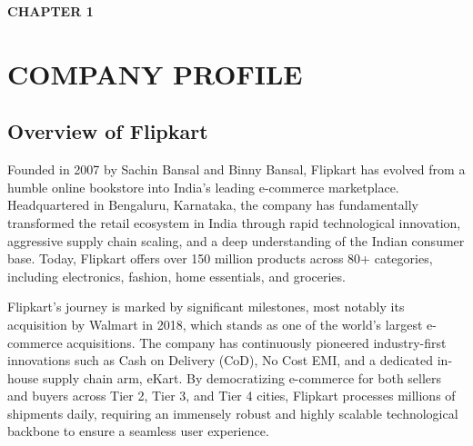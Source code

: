 \textbf{\huge CHAPTER  1}\\
\section{COMPANY PROFILE} \setcounter{section}{1}
\subsection{Overview of Flipkart}\setcounter{subsection}{1}
\begin{justify}
    Founded in 2007 by Sachin Bansal and Binny Bansal, Flipkart has evolved from a humble online bookstore into India's leading e-commerce marketplace. Headquartered in Bengaluru, Karnataka, the company has fundamentally transformed the retail ecosystem in India through rapid technological innovation, aggressive supply chain scaling, and a deep understanding of the Indian consumer base. Today, Flipkart offers over 150 million products across 80+ categories, including electronics, fashion, home essentials, and groceries. 

    Flipkart's journey is marked by significant milestones, most notably its acquisition by Walmart in 2018, which stands as one of the world's largest e-commerce acquisitions. The company has continuously pioneered industry-first innovations such as Cash on Delivery (CoD), No Cost EMI, and a dedicated in-house supply chain arm, eKart. By democratizing e-commerce for both sellers and buyers across Tier 2, Tier 3, and Tier 4 cities, Flipkart processes millions of shipments daily, requiring an immensely robust and highly scalable technological backbone to ensure a seamless user experience.
\end{justify}

\vspace{0.25cm}

